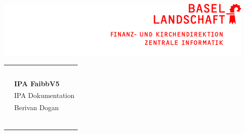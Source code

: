\documentclass[10pt, oneside]{scrartcl}
\begin{document}


\thispagestyle{empty}

\includegraphics{images/bl}

\begin{tabularx}{\linewidth}{l l}
	&\\ 
	&\\
	&\\
	&\\
	&\\ 
	 & \textbf{IPA FaibbV5} \\
	 & IPA Dokumentation \\
	 & Berivan Dogan \\
	 &\\ 
	 &\\ 
	 &\\ 
	 &\\ 
	 &\\ 
	 &
\end{tabularx}

\newpage
{}  

\tableofcontents
\end{document}
